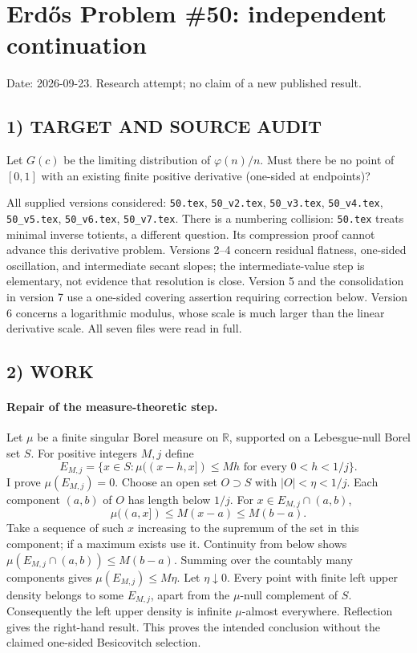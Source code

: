 \section{Erd\H{o}s Problem \#50: independent continuation}
\noindent Date: 2026-09-23. Research attempt; no claim of a new published result.
\subsection{1) TARGET AND SOURCE AUDIT}
Let $G(c)$ be the limiting distribution of $\varphi(n)/n$. Must there be no point of $[0,1]$ with an existing finite positive derivative (one-sided at endpoints)?

All supplied versions considered: \texttt{50.tex}, \texttt{50\_v2.tex}, \texttt{50\_v3.tex}, \texttt{50\_v4.tex}, \texttt{50\_v5.tex}, \texttt{50\_v6.tex}, \texttt{50\_v7.tex}.
There is a numbering collision: \texttt{50.tex} treats minimal inverse totients, a different question. Its compression proof cannot advance this derivative problem. Versions 2--4 concern residual flatness, one-sided oscillation, and intermediate secant slopes; the intermediate-value step is elementary, not evidence that resolution is close. Version 5 and the consolidation in version 7 use a one-sided covering assertion requiring correction below. Version 6 concerns a logarithmic modulus, whose scale is much larger than the linear derivative scale. All seven files were read in full.
\subsection{2) WORK}
\paragraph{Repair of the measure-theoretic step.}
Let $\mu$ be a finite singular Borel measure on $\mathbb R$, supported on a Lebesgue-null Borel set $S$. For positive integers $M,j$ define
\[
E_{M,j}=\{x\in S:\mu((x-h,x])\le Mh\text{ for every }0<h<1/j\}.
\]
I prove $\mu(E_{M,j})=0$. Choose an open set $O\supset S$ with $|O|<\eta<1/j$. Each component $(a,b)$ of $O$ has length below $1/j$. For $x\in E_{M,j}\cap(a,b)$,
\[
\mu((a,x])\le M(x-a)\le M(b-a).
\]
Take a sequence of such $x$ increasing to the supremum of the set in this component; if a maximum exists use it. Continuity from below shows
$\mu(E_{M,j}\cap(a,b))\le M(b-a)$. Summing over the countably many components gives $\mu(E_{M,j})\le M\eta$. Let $\eta\downarrow0$.
Every point with finite left upper density belongs to some $E_{M,j}$, apart from the $\mu$-null complement of $S$. Consequently the left upper density is infinite $\mu$-almost everywhere. Reflection gives the right-hand result. This proves the intended conclusion without the claimed one-sided Besicovitch selection.

